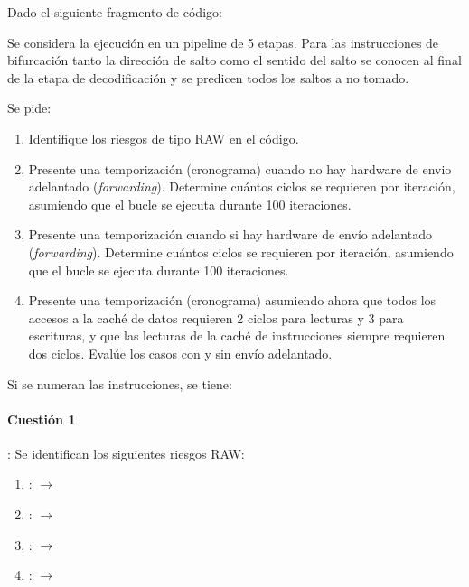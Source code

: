 \begin{acexercise}\end{acexercise}
\label{ex:m4-01:instr-01}

Dado el siguiente fragmento de código:



Se considera la ejecución en un pipeline de 5 etapas.
Para las instrucciones de bifurcación tanto la dirección de salto como el
sentido del salto se conocen al final de la etapa de decodificación y se
predicen todos los saltos a no tomado.

Se pide:
\begin{enumerate}
  \item Identifique los riesgos de tipo RAW en el código.

  \item Presente una temporización (cronograma) cuando no hay hardware de envio adelantado
        (\emph{forwarding}). Determine cuántos ciclos se requieren por iteración,
        asumiendo que el bucle se ejecuta durante 100 iteraciones.

  \item Presente una temporización cuando si hay hardware de envío adelantado
        (\emph{forwarding}). Determine cuántos ciclos se requieren por iteración,
        asumiendo que el bucle se ejecuta durante 100 iteraciones.

  \item Presente una temporización (cronograma) asumiendo ahora que todos los accesos 
        a la caché de datos requieren 2 ciclos para lecturas y 3 para escrituras,
        y que las lecturas de la caché de instrucciones siempre requieren dos ciclos.
        Evalúe los casos con y sin envío adelantado.
\end{enumerate}


\begin{acsolution}\end{acsolution}

Si se numeran las instrucciones, se tiene:



\paragraph{Cuestión 1}: Se identifican los siguientes riesgos RAW:

\begin{enumerate}
  \item {}:  $\rightarrow$ 
  \item {}:  $\rightarrow$ 
  \item {}:  $\rightarrow$ 
  \item {}:  $\rightarrow$ 
\end{enumerate}

